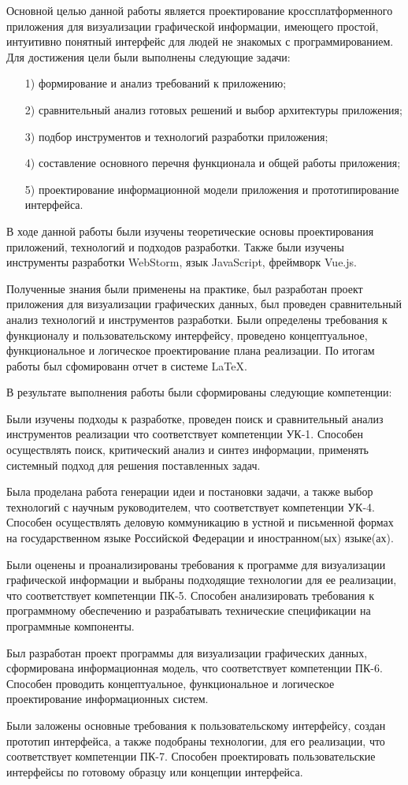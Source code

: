 \conclusion
Основной целью данной работы является проектирование кроссплатформенного приложения для визуализации графической информации, имеющего простой, интуитивно понятный интерфейс для людей не знакомых с программированием.
Для достижения цели были выполнены следующие задачи:
\begin{enumerate}
    \item [1)] формирование и анализ требований к приложению;
    \item [2)] сравнительный анализ готовых решений и выбор архитектуры приложения;
    \item [3)] подбор инструментов и технологий разработки приложения;
    \item [4)] составление основного перечня функционала и общей работы приложения;
    \item [5)] проектирование информационной модели приложения и прототипирование интерфейса.
\end{enumerate}

В ходе данной работы были изучены теоретические основы проектирования приложений, технологий и подходов разработки. Также были изучены инструменты разработки WebStorm, язык JavaScript, фреймворк Vue.js. 

Полученные знания были применены на практике, был разработан проект приложения для визуализации графических данных, был проведен сравнительный анализ технологий и инструментов разработки. Были определены требования к функционалу и пользовательскому интерфейсу, проведено концептуальное, функциональное и логическое проектирование плана реализации. По итогам работы был сфомированн отчет в системе \LaTeX.

В результате выполнения работы были сформированы следующие компетенции:

Были изучены подходы к разработке, проведен поиск и сравнительный анализ инструментов реализации что соответствует компетенции 
УК-1. Способен осуществлять поиск, критический анализ и синтез
информации, применять системный подход для решения поставленных
задач.

Была проделана работа генерации идеи и постановки задачи, а также выбор технологий с научным руководителем, что соответствует компетенции 
УК-4. Способен осуществлять деловую коммуникацию в устной и
письменной формах на государственном языке Российской
Федерации и иностранном(ых) языке(ах).

Были оценены и проанализированы требования к программе для визуализации графической информации и выбраны подходящие технологии для ее реализации, что соответствует компетенции
ПК-5. Способен анализировать требования к программному обеспечению
и разрабатывать технические спецификации на программные компоненты.

Был разработан проект программы для визуализации графических данных, сформирована информационная модель, что соответствует компетенции
ПК-6. Способен проводить концептуальное, функциональное и логическое
проектирование информационных систем.

Были заложены основные требования к пользовательскому интерфейсу, создан прототип интерфейса, а также подобраны технологии, для его реализации, что соответствует компетенции
ПК-7. Способен проектировать пользовательские интерфейсы по готовому
образцу или концепции интерфейса.
